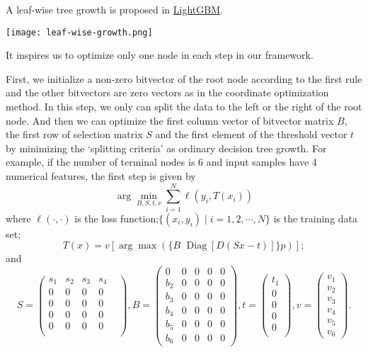 \documentclass[UTF8]{article}
\begin{document}
A leaf-wise tree growth is proposed  in
\href{https://papers.nips.cc/paper/6907-lightgbm-a-highly-efficient-gradient-boosting-decision-tree.pdf}{LightGBM}.
\begin{center}
  \texttt{[image: leaf-wise-growth.png]}
\end{center}
It inspires us to optimize only one node in each step in our framework.

First, we initialize a non-zero bitvector of the root node according to the first rule
and the other bitvectors are zero vectors as in the coordinate optimization method.
In this step, we only can split the data to the left or the right of the root node.
And then we can optimize the first column vector of bitvector matrix $B$, the first row of selection matrix $S$
and the first element of the threshold vector $t$ by minimizing the `splitting criteria'
as ordinary decision tree growth.
For example, if the number of terminal nodes is $6$ and input samples have 4 numerical features,
the first step is given by
\begin{equation}\label{equa4}\arg\min_{B, S, t,v}\sum_{i=1}^{N}\ell(y_i, T(x_i))\end{equation}
where $\ell(\cdot,\cdot)$ is the loss function;$\{(x_i, y_i)\mid i=1,2,\cdots, N\}$ is the training data set;
$$T(x)=v[\arg\max(\{B\,\,\operatorname{Diag}[D(Sx-t)]\}p)];$$
and
$$
S=\begin{pmatrix}
s_1 & s_2 & s_3 & s_4 \\
0 & 0& 0& 0& \\
0 & 0& 0& 0& \\
0 & 0& 0& 0& \\
0 & 0& 0& 0& \\
\end{pmatrix},
B=
\begin{pmatrix}
0   & 0 & 0 & 0 & 0 \\
b_2 & 0 & 0 & 0 & 0 \\
b_3 & 0 & 0 & 0 & 0 \\
b_4 & 0 & 0 & 0 & 0 \\
b_5 & 0 & 0 & 0 & 0 \\
b_6 & 0 & 0 & 0 & 0
\end{pmatrix},
t=\begin{pmatrix}
t_1\\ 0\\ 0\\ 0\\ 0\\
\end{pmatrix},
v=\begin{pmatrix}
v_1\\ v_2\\ v_3\\ v_4\\ v_5\\ v_6
\end{pmatrix}.
$$
\end{document}
